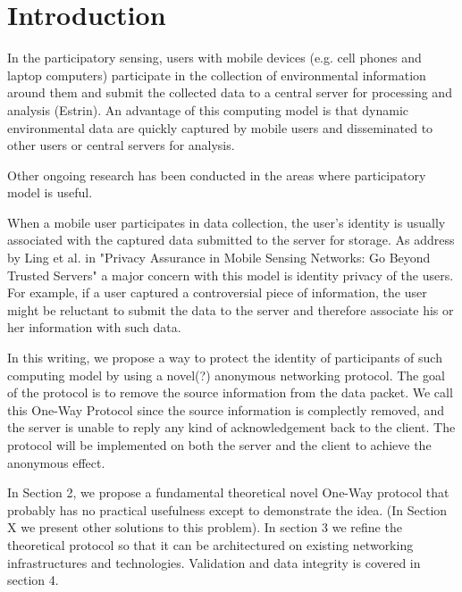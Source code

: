 \section{Introduction}\label{sec-intro}
In the participatory sensing, users with mobile devices (e.g. cell phones
and laptop computers) participate in the collection of environmental
information around them and submit the collected data to a central server
for processing and analysis (Estrin). An advantage of this computing model
is that dynamic environmental data are quickly captured by mobile users
and disseminated to other users or central servers for analysis.

Other ongoing research has been conducted in the areas where participatory
model is useful.

When a mobile user participates in data collection, the user's identity is usually associated with the captured data submitted to the server for
storage.  As address by Ling et al. in "Privacy Assurance in Mobile Sensing Networks: Go Beyond Trusted Servers" a major concern with this model is
identity privacy of the users. For example, if a user captured a controversial
piece of information, the user might be reluctant to submit the data
to the server and therefore associate his or her information with such data.

In this writing, we propose a way to protect the identity of participants
of such computing model by using a novel(?) anonymous networking protocol.
The goal of the protocol is to remove the source information from the data
packet. We call this One-Way Protocol since the source information is
complectly removed, and the server is unable to reply any kind of
acknowledgement back to the client. The protocol will be implemented on
both the server and the client to achieve the anonymous effect.

In Section 2, we propose a fundamental theoretical novel One-Way protocol
that probably has no practical usefulness except to demonstrate the idea.
(In Section X we present other solutions to this problem). In section 3
we refine the theoretical protocol so that it can be architectured on
existing networking infrastructures and technologies. Validation and data
integrity is covered in section 4. 